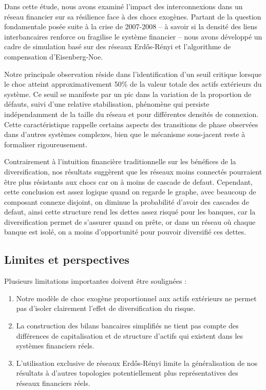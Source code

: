 
Dans cette étude, nous avons examiné l'impact des interconnexions dans un réseau financier sur sa résilience face à des chocs exogènes.
Partant de la question fondamentale posée suite à la crise de 2007-2008 -- à savoir si la densité des liens interbancaires renforce ou fragilise le système financier -- nous avons développé un cadre de simulation basé sur des réseaux Erdős-Rényi et l'algorithme de compensation d'Eisenberg-Noe.

Notre principale observation réside dans l'identification d'un seuil critique lorsque le choc atteint approximativement 50\% de la valeur totale des actifs extérieurs du système.
Ce seuil se manifeste par un pic dans la variation de la proportion de défauts, suivi d'une relative stabilisation, phénomène qui persiste indépendamment de la taille du réseau et pour différentes densités de connexion.
Cette caractéristique rappelle certains aspects des transitions de phase observées dans d'autres systèmes complexes, bien que le mécanisme sous-jacent reste à formaliser rigoureusement.

Contrairement à l'intuition financière traditionnelle sur les bénéfices de la diversification, nos résultats suggèrent que les réseaux moins connectés pourraient être plus résistants aux chocs car on à moins de cascade de defaut.
Cependant, cette conclusion est assez logique quand on regarde le graphe, avec beaucoup de composant connexe disjoint, on diminue la probabilité d'avoir des cascades de defaut, ainsi cette structure rend
les dettes assez risqué pour les banques, car la diversification permet de s'assurer quand on prête, or dans un réseau où chaque banque est isolé, on a moins d'opportunité pour pouvoir diversifié ces dettes.



\subsection{Limites et perspectives}\label{subsec:limites-et-perspectives}

Plusieurs limitations importantes doivent être soulignées :

\begin{enumerate}
    \item Notre modèle de choc exogène proportionnel aux actifs extérieurs ne permet pas d'isoler clairement l'effet de diversification du risque.

    \item La construction des bilans bancaires simplifiés ne tient pas compte des différences de capitalisation et de structure d'actifs qui existent dans les systèmes financiers réels.

    \item L'utilisation exclusive de réseaux Erdős-Rényi limite la généralisation de nos résultats à d'autres topologies potentiellement plus représentatives des réseaux financiers réels.
\end{enumerate}

